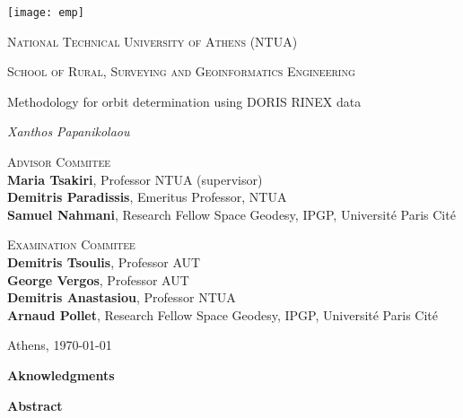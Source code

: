 \begin{center}
  \texttt{[image: emp]}\par\vspace{1cm}
  {\Large \textsc{National Technical University of Athens (NTUA)} \par}
  {\Large \textsc{School of Rural, Surveying and Geoinformatics Engineering} \par}
  \vspace{.5cm}
  {\huge Methodology for orbit determination using DORIS RINEX data \par}
  \vspace{2cm}
  {\Large\itshape Xanthos Papanikolaou\par}
  \vfill

  \textsc{Advisor Commitee}\\
  \textbf{Maria Tsakiri}, Professor NTUA (supervisor)\\
  \textbf{Demitris Paradissis}, Emeritus Professor, NTUA \\
  \textbf{Samuel Nahmani}, Research Fellow Space Geodesy, IPGP, Université Paris Cité \par

  \textsc{Examination Commitee}\\
  \textbf{Demitris Tsoulis}, Professor AUT \\
  \textbf{George Vergos}, Professor AUT \\
  \textbf{Demitris Anastasiou}, Professor NTUA \\
  \textbf{Arnaud Pollet}, Research Fellow Space Geodesy, IPGP, Université Paris Cité \par

  \vfill
  {\large Athens, \today\par}
\end{center}

\begin{flushright}
  {\Large \bfseries Aknowledgments}
\end{flushright}
\clearpage

\begin{flushright}
  {\Large \bfseries Abstract}
\end{flushright}
\clearpage
